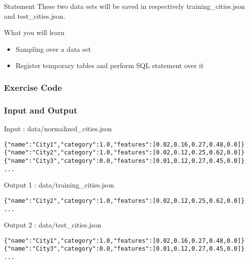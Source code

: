 \documentclass[slidetop,9pt,utf8]{beamer}
\begin{document}
\begin{CJK}{UTF8}{gbsn}
\begin{frame}
\begin{block}{Statement}
    These two data sets will be saved in respectively training\_cities.json and test\_cities.json.
  \end{block}

  \begin{block}{What you will learn}
    \begin{itemize}
      \item Sampling over a data set
      \item Register temporary tables and perform SQL statement over it
    \end{itemize}
  \end{block}

\end{frame}

\begin{frame}
  \frametitle{Exercise Code}

  

\end{frame}

\begin{frame}[fragile]

  \frametitle{Input and Output}
  
  \begin{block}{Input : data/normalized\_cities.json}
    \begin{verbatim}
{"name":"City1","category":1.0,"features":[0.02,0.16,0.27,0.48,0.0]}
{"name":"City2","category":1.0,"features":[0.02,0.12,0.25,0.62,0.0]}
{"name":"City3","category":0.0,"features":[0.01,0.12,0.27,0.45,0.0]}
...
    \end{verbatim}
  \end{block}

  \begin{block}{Output 1 : data/training\_cities.json}
    \begin{verbatim}
{"name":"City2","category":1.0,"features":[0.02,0.12,0.25,0.62,0.0]}
...
    \end{verbatim}
  \end{block}

  \begin{block}{Output 2 : data/test\_cities.json}
    \begin{verbatim}
{"name":"City1","category":1.0,"features":[0.02,0.16,0.27,0.48,0.0]}
{"name":"City3","category":0.0,"features":[0.01,0.12,0.27,0.45,0.0]}
...
    \end{verbatim}
  \end{block}


\end{frame}
\end{CJK}
\end{document}
